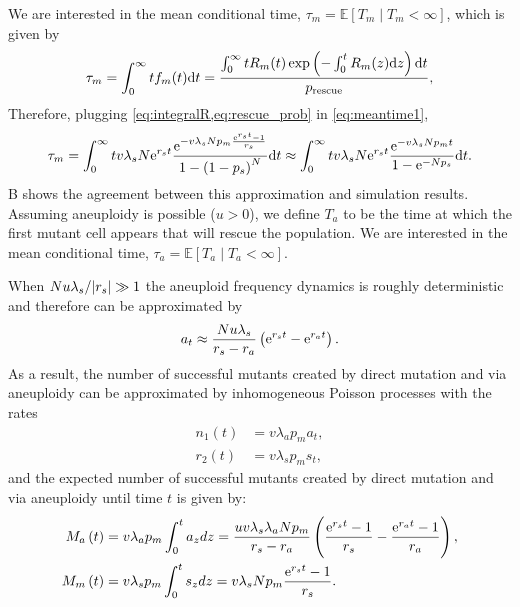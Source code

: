 \documentclass[12pt]{extarticle}
\renewcommand{\d}[1]{\ensuremath{\operatorname{d}\!{#1}}}
\renewcommand{\d}{{\rm d}}
\newcommand{\e}{{\rm e}}
\newcommand{\presc}{p_\text{rescue}}
\renewcommand{\Delta}{r}
\begin{document}
\begin{appendices}
We are interested in the mean conditional time, $\tau_m=\mathbb{E}\left[T_m \mid T_m<\infty\right]$, which is given by
\begin{equation}\label{eq:meantime1}
\begin{aligned}
\tau_m =
\int_{0}^{\infty}{t f_m(t) \d t} = 
\frac{\int_{0}^{\infty}{tR_m(t)\exp\left(-\int_0^{t}{R_m(z)\d z}\right) \d t}}{\presc},
\end{aligned}
\end{equation}
Therefore, plugging \cref{eq:integralR,eq:rescue_prob} in \cref{eq:meantime1}, 
\begin{align}\label{eq:limitapprox_appendix}
\tau_m = 
\int_0^\infty tv\lambda_s N\e^{\Delta_st}\frac{\e^{-v\lambda_s N p_m\frac{\e^{\Delta_s t}-1}{\Delta_s}} }{1-\left(1-p_s\right)^N} \d t\approx
\int_{0}^{\infty} tv\lambda_s N\e^{\Delta_st}\frac{\e^{-v\lambda_s N p_mt} }{1-\e^{-Np_s}}\d t. 
\end{align}
B shows the agreement between this approximation and simulation results. %
\\
Assuming aneuploidy is possible ($u>0$), we define $T_a$ to be the time at which the first mutant cell appears that will rescue the population. We are interested in the mean conditional time, $\tau_a=\mathbb{E}\left[T_a \mid T_a<\infty\right]$.

When $Nu\lambda_s/\abs{\Delta_s}\gg1$ the aneuploid frequency dynamics is roughly deterministic and therefore can be approximated by 
\begin{equation}\label{aneuploidpopeq}
a_t \approx \frac{Nu\lambda_s}{\Delta_s-\Delta_a}\left(\e^{\Delta_st}-\e^{\Delta_a t}\right).
\end{equation}
As a result, the number of successful mutants created by direct mutation and via aneuploidy can be approximated by inhomogeneous Poisson processes with the rates
\begin{align*}
n_1\left(t\right)&=v\lambda_ap_ma_{t},\\
r_2\left(t\right)&=v\lambda_sp_ms_{t},
\end{align*}
and the expected number of successful mutants created by direct mutation and via aneuploidy until time $t$ is given by:
\begin{align}
M_a\left(t\right)&=v\lambda_ap_m\int_0^ta_{z} d z = \frac{uv\lambda_s\lambda_aNp_m}{\Delta_s-\Delta_a}\left(\frac{\e^{\Delta_st}-1}{\Delta_s}-\frac{\e^{\Delta_at}-1}{\Delta_a}\right),\label{eq:twosteplineage}\\ 
M_m\left(t\right)&=v\lambda_sp_m\int_0^ts_{z} d z = v\lambda_sNp_m\frac{\e^{\Delta_s t}-1}{\Delta_s}.\label{eq:twosteplineagedirect}
\end{align} %


\end{appendices}
\end{document}

